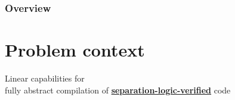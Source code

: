 \documentclass{beamer}
\begin{document}
\begin{frame}
\end{frame}

\begin{frame}
\frametitle{Overview} %
\tableofcontents %
\end{frame}

\section{Problem context}

\begin{frame}[plain,c]

\begin{center}
\Huge Linear capabilities for\\  fully abstract
compilation of \textbf{\underline{separation-logic-verified}} code
\end{center}
\end{frame}
\end{document}

